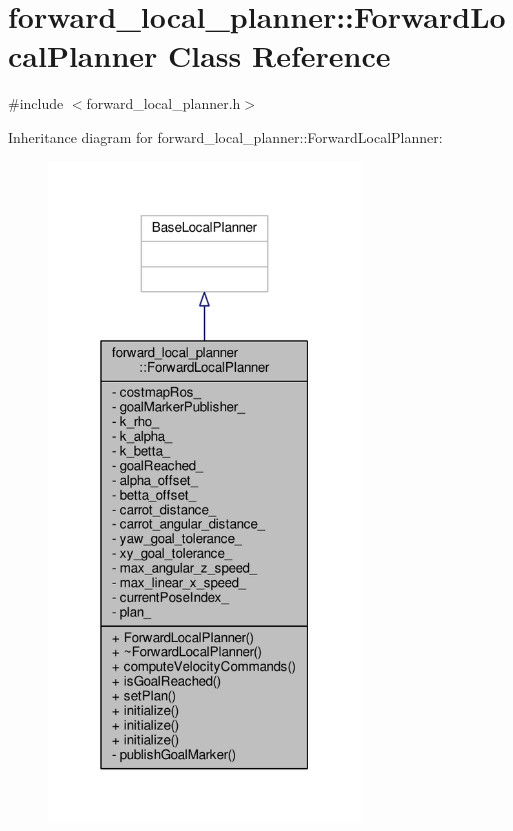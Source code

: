 \hypertarget{classforward__local__planner_1_1ForwardLocalPlanner}{}\section{forward\+\_\+local\+\_\+planner\+:\+:Forward\+Local\+Planner Class Reference}
\label{classforward__local__planner_1_1ForwardLocalPlanner}


{\ttfamily \#include $<$forward\+\_\+local\+\_\+planner.\+h$>$}



Inheritance diagram for forward\+\_\+local\+\_\+planner\+:\+:Forward\+Local\+Planner\+:
\nopagebreak
\begin{figure}[H]
\begin{center}
\leavevmode
\includegraphics[width=235pt]{classforward__local__planner_1_1ForwardLocalPlanner__inherit__graph}
\end{center}
\end{figure}


